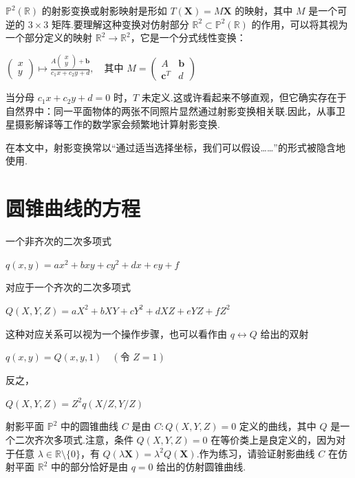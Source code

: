 \(\mathbb{P}^2(\mathbb{R})\) 的射影变换或射影映射是形如 \(T(\mathbf{X}) = M\mathbf{X}\) 的映射，其中 \(M\) 是一个可逆的 \(3 \times 3\) 矩阵.要理解这种变换对仿射部分 \(\mathbb{R}^2 \subset \mathbb{P}^2(\mathbb{R})\) 的作用，可以将其视为一个部分定义的映射 \(\mathbb{R}^2 \to \mathbb{R}^2\)，它是一个分式线性变换：

\(
\begin{pmatrix} x \\ y \end{pmatrix} \mapsto \frac{A\begin{pmatrix} x \\ y \end{pmatrix} + \mathbf{b}}{c_1x + c_2y + d}, \quad \text{其中 } M = \begin{pmatrix} A & \mathbf{b} \\ \mathbf{c}^T & d \end{pmatrix}
\)

当分母 \(c_1x + c_2y + d = 0\) 时，\(T\) 未定义.这或许看起来不够直观，但它确实存在于自然界中：同一平面物体的两张不同照片显然通过射影变换相关联.因此，从事卫星摄影解译等工作的数学家会频繁地计算射影变换.

在本文中，射影变换常以“通过适当选择坐标，我们可以假设……”的形式被隐含地使用.

\section{圆锥曲线的方程}

一个非齐次的二次多项式

\(
q(x,y) = ax^2 + bxy + cy^2 + dx + ey + f
\)

对应于一个齐次的二次多项式

\(
Q(X,Y,Z) = aX^2 + bXY + cY^2 + dXZ + eYZ + fZ^2
\)

这种对应关系可以视为一个操作步骤，也可以看作由 \(q \leftrightarrow Q\) 给出的双射

\(
q(x,y) = Q(x,y,1) \quad (\text{令 } Z=1)
\)

反之，

\(
Q(X,Y,Z) = Z^2 q(X/Z, Y/Z)
\)

射影平面 \(\mathbb{P}^2\) 中的圆锥曲线 \(C\) 是由 \(C: Q(X,Y,Z) = 0\) 定义的曲线，其中 \(Q\) 是一个二次齐次多项式.注意，条件 \(Q(X,Y,Z) = 0\) 在等价类上是良定义的，因为对于任意 \(\lambda \in \mathbb{R} \setminus \{0\}\)，有 \(Q(\lambda\mathbf{X}) = \lambda^2 Q(\mathbf{X})\).作为练习，请验证射影曲线 \(C\) 在仿射平面 \(\mathbb{R}^2\) 中的部分恰好是由 \(q=0\) 给出的仿射圆锥曲线.

